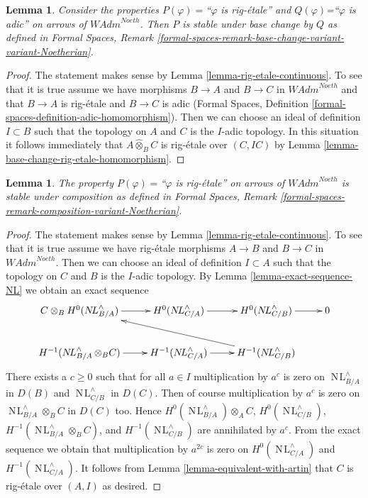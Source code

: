 \documentclass{stacks-project}
\theoremstyle{plain}
\newtheorem{lemma}[subsection]{Lemma}
\theoremstyle{definition}
\theoremstyle{remark}
\numberwithin{equation}{subsection}
\def\NL{\mathop{N\!L}\nolimits}
\begin{document}
\begin{lemma}
\label{lemma-base-change-rig-etale-continuous}
Consider the properties $P(\varphi)=$``$\varphi$ is rig-\'etale''
and $Q(\varphi)$=``$\varphi$ is adic'' on arrows of $\textit{WAdm}^{Noeth}$.
Then $P$ is stable under base change by $Q$ as defined in
Formal Spaces, Remark
\ref{formal-spaces-remark-base-change-variant-variant-Noetherian}.
\end{lemma}

\begin{proof}
The statement makes sense by Lemma \ref{lemma-rig-etale-continuous}.
To see that it is true assume we have morphisms
$B \to A$ and $B \to C$ in $\textit{WAdm}^{Noeth}$
and that $B \to A$ is rig-\'etale and $B \to C$ is adic
(Formal Spaces, Definition
\ref{formal-spaces-definition-adic-homomorphism}).
Then we can choose an ideal of definition $I \subset B$
such that the topology on $A$ and $C$ is the $I$-adic topology.
In this situation it follows immediately that
$A \widehat{\otimes}_B C$ is rig-\'etale over $(C, IC)$ by
Lemma \ref{lemma-base-change-rig-etale-homomorphism}.
\end{proof}

\begin{lemma}
\label{lemma-composition-rig-etale-continuous}
The property $P(\varphi)=$``$\varphi$ is rig-\'etale''
on arrows of $\textit{WAdm}^{Noeth}$ is stable under composition
as defined in Formal Spaces, Remark
\ref{formal-spaces-remark-composition-variant-Noetherian}.
\end{lemma}

\begin{proof}
The statement makes sense by
Lemma \ref{lemma-rig-etale-continuous}.
To see that it is true assume we have rig-\'etale morphisms
$A \to B$ and $B \to C$ in $\textit{WAdm}^{Noeth}$.
Then we can choose an ideal of definition $I \subset A$
such that the topology on $C$ and $B$ is the $I$-adic topology.
By Lemma \ref{lemma-exact-sequence-NL} we obtain an exact sequence
$$
\xymatrix{
C \otimes_B H^0(\NL_{B/A}^\wedge) \ar[r] &
H^0(\NL_{C/A}^\wedge) \ar[r] &
H^0(\NL_{C/B}^\wedge) \ar[r] & 0 \\
H^{-1}(\NL_{B/A}^\wedge \otimes_B C) \ar[r] &
H^{-1}(\NL_{C/A}^\wedge) \ar[r] &
H^{-1}(\NL_{C/B}^\wedge) \ar[llu]
}
$$
There exists a $c \geq 0$ such that for all $a \in I$ 
multiplication by $a^c$ is zero on $\NL_{B/A}^\wedge$ in $D(B)$ and
$\NL_{C/B}^\wedge$ in $D(C)$. Then of course
multiplication by $a^c$ is zero on $\NL_{B/A}^\wedge \otimes_B C$
in $D(C)$ too. Hence
$H^0(\NL_{B/A}^\wedge) \otimes_A C$, 
$H^0(\NL_{C/B}^\wedge)$, 
$H^{-1}(\NL_{B/A}^\wedge \otimes_B C)$, and
$H^{-1}(\NL_{C/B}^\wedge)$
are annihilated by $a^c$. From the exact sequence
we obtain that multiplication by $a^{2c}$ is zero on
$H^0(\NL_{C/A}^\wedge)$ and $H^{-1}(\NL_{C/A}^\wedge)$.
It follows from Lemma \ref{lemma-equivalent-with-artin}
that $C$ is rig-\'etale over $(A, I)$ as desired.
\end{proof}
\end{document}
